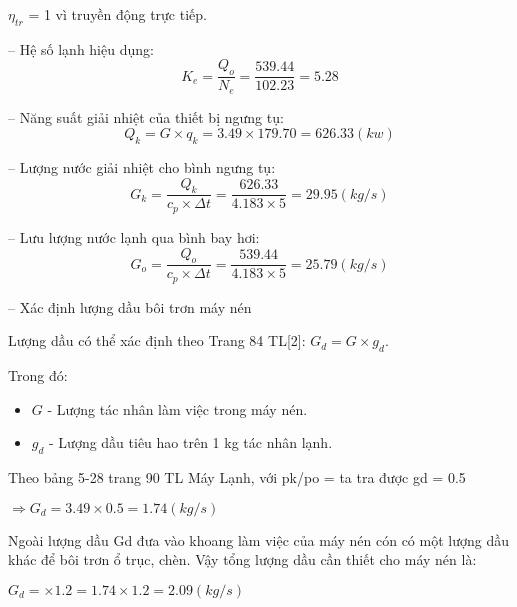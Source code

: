 $ \eta_{tr} $ = 1 vì truyền động trực tiếp. 

-- Hệ số lạnh hiệu dụng:
\begin{equation*}
	K_{e} = \dfrac{Q_{o}}{N_{e}} = \dfrac{539.44}{102.23} = 5.28
\end{equation*}

-- Năng suất giải nhiệt của thiết bị ngưng tụ:
\begin{equation*}
	Q_{k} = G\times q_{k} = 3.49 \times 179.70 = 626.33(kw)
\end{equation*}

-- Lượng nước giải nhiệt cho bình ngưng tụ:
\begin{equation*}
	G_{k} = \dfrac{Q_{k}}{c_{p}\times \Delta t} = \dfrac{626.33}{4.183\times 5} = 29.95(kg/s)
\end{equation*}

-- Lưu lượng nước lạnh qua bình bay hơi:
\begin{equation*}
	G_{o} = \dfrac{Q_{o}}{c_{p}\times \Delta t} = \dfrac{539.44}{4.183 \times 5} = 25.79(kg/s)
\end{equation*}

-- Xác định lượng dầu bôi trơn máy nén

Lượng dầu có thể xác định theo Trang 84 TL[2]: $G_{d} = G\times g_{d}$.

Trong đó:
\begin{itemize}
	\item $G$ - Lượng tác nhân làm việc trong máy nén.
	\item $g_{d}$ - Lượng dầu tiêu hao trên 1 kg tác nhân lạnh.
\end{itemize}

Theo bảng 5-28 trang 90 TL Máy Lạnh, với pk/po =  ta tra được gd = 0.5

$\Rightarrow G_{d} = 3.49 \times 0.5 = 1.74(kg/s)$

Ngoài lượng dầu Gd đưa vào khoang làm việc của máy nén cón có một lượng dầu khác để bôi trơn ổ trục, chèn. Vậy tổng lượng dầu cần thiết cho máy nén là:

$G_{d} = \times 1.2 = 1.74 \times 1.2 = 2.09(kg/s)$
